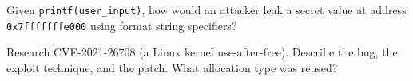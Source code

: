 \begin{exercise}
	Given \texttt{printf(user\_input)}, how would an attacker leak a secret value at address \texttt{0x7fffffffe000} using format string specifiers?
\end{exercise}

\begin{exercise}
	Research CVE-2021-26708 (a Linux kernel use-after-free). Describe the bug, the exploit technique, and the patch. What allocation type was reused?
\end{exercise}
